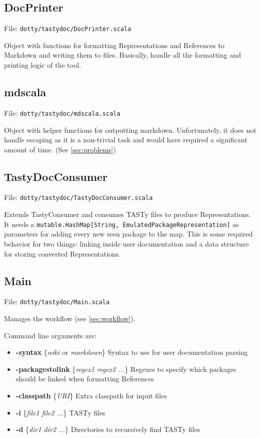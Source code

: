 \documentclass{report}
\begin{document}
\subsection{DocPrinter}
File: \texttt{dotty/tastydoc/DocPrinter.scala}

Object with functions for formatting Representations and References to Markdown and writing them to files. Basically, handle all the formatting and printing logic of the tool.

\subsection{mdscala}
File: \texttt{dotty/tastydoc/mdscala.scala}

Object with helper functions for outputting markdown. Unfortunately, it does not handle escaping as it is a non-trivial task and would have required a significant amount of time. (See \autoref{sec:problems})

\subsection{TastyDocConsumer}
File: \texttt{dotty/tastydoc/TastyDocConsumer.scala}

Extends TastyConsumer and consumes TASTy files to produce Representations. It needs a \texttt{mutable.HashMap[String, EmulatedPackageRepresentation]} as parameters for adding every new seen package to the map. This is some required behavior for two things: linking inside user documentation and a data structure for storing converted Representations.
\subsection{Main}
File: \texttt{dotty/tastydoc/Main.scala}

Manages the workflow (see \autoref{sec:workflow}).

Command line arguments are:
\begin{itemize}
    \item \textbf{-syntax} \{\textit{wiki} or \textit{markdown}\} Syntax to use for user documentation parsing
    \item \textbf{-packagestolink} \{\textit{regex1 regex2 ...}\} Regexes to specify which packages should be linked when formatting References
    \item \textbf{-classpath} \{\textit{URI}\} Extra classpath for input files
    \item \textbf{-i} \{\textit{file1 file2 ...}\} TASTy files
    \item \textbf{-d} \{\textit{dir1 dir2 ...}\} Directories to recursively find TASTy files
\end{itemize}
\end{document}
